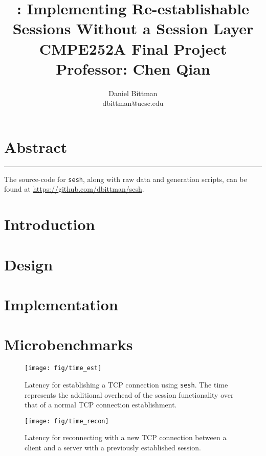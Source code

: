 \documentclass[twocolumn,10pt]{article}
\author{Daniel Bittman \\ dbittman@ucsc.edu}
\title{\sesh: \textbf{Implementing Re-establishable\\Sessions Without a Session Layer}
\\
{\vspace{5mm}\normalsize CMPE252A Final Project\\\vspace{-3mm} Professor: Chen Qian}
}
\newcommand{\sesh}{\texttt{sesh}\xspace}
\begin{document}
\biolinum
\maketitle
\libertine
\renewcommand\ttdefault{lmtt}

\section*{Abstract}


\begin{center}\noindent\rule{2cm}{0.4pt}\end{center}

The source-code for \sesh, along with raw data and generation scripts,
can be found at \url{https://github.com/dbittman/sesh}.

\section{Introduction}





\section{Design}



\section{Implementation}



\section{Microbenchmarks}


\begin{figure}
	\centering
	\texttt{[image: fig/time\_est]}
	\caption{Latency for establishing a TCP connection using \sesh. The time
	represents the additional overhead of the session functionality over that of
	a normal TCP connection establishment.}
	\label{fig:est}
\end{figure}

\begin{figure}
	\centering
	\texttt{[image: fig/time\_recon]}
	\caption{Latency for reconnecting with a new TCP connection between a client
	and a server with a previously established session.}
	\label{fig:recon}
\end{figure}
\end{document}
